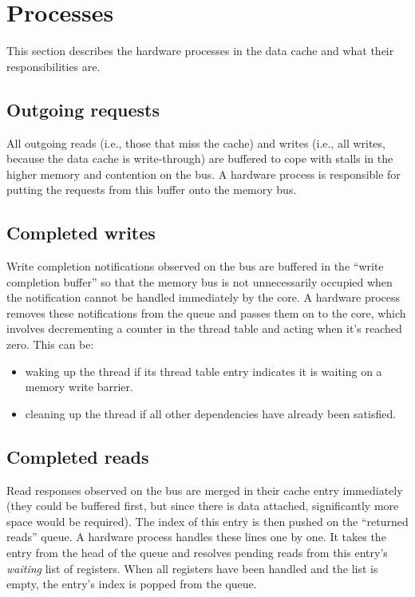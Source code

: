 \section{Processes}
This section describes the hardware processes in the data cache and what their responsibilities are.

\subsection{Outgoing requests}
All outgoing reads (i.e., those that miss the cache) and writes (i.e., all writes, because the data cache is write-through) are buffered to cope with stalls in the higher memory and contention on the bus. A hardware process is responsible for putting the requests from this buffer onto the memory bus.

\subsection{Completed writes}
Write completion notifications observed on the bus are buffered in the ``write completion buffer'' so that the memory bus is not unnecessarily occupied when the notification cannot be handled immediately by the core. A hardware process removes these notifications from the queue and passes them on to the core, which involves decrementing a counter in the thread table and acting when it's reached zero. This can be:
\begin{itemize}
  \item{} waking up the thread if its thread table entry indicates it is waiting on a memory write barrier.
  \item{} cleaning up the thread if all other dependencies have already been satisfied.
\end{itemize}

\subsection{Completed reads}
Read responses observed on the bus are merged in their cache entry immediately (they could be buffered first, but since there is data attached, significantly more space would be required). The index of this entry is then pushed on the ``returned reads'' queue. A hardware process handles these lines one by one. It takes the entry from the head of the queue and resolves pending reads from this entry's \emph{waiting} list of registers. When all registers have been handled and the list is empty, the entry's index is popped from the queue.